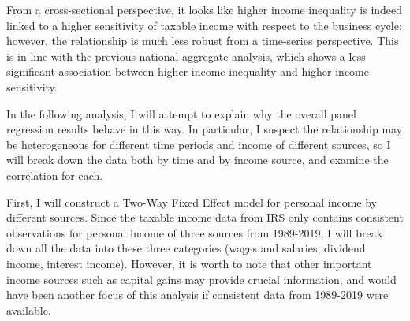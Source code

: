 \documentclass{article}
\begin{document}
From a cross-sectional perspective, it looks like higher income inequality is indeed linked to a higher sensitivity of taxable income with respect to the business cycle; however, the relationship is much less robust from a time-series perspective. This is in line with the previous national aggregate analysis, which shows a less significant association between higher income inequality and higher income sensitivity. 

\vspace{5mm}

In the following analysis, I will attempt to explain why the overall panel regression results behave in this way. In particular, I suspect the relationship may be heterogeneous for different time periods and income of different sources, so I will break down the data both by time and by income source, and examine the correlation for each. 

First, I will construct a Two-Way Fixed Effect model for personal income by different sources. Since the taxable income data from IRS only contains consistent observations for personal income of three sources from 1989-2019, I will break down all the data into these three categories (wages and salaries, dividend income, interest income). However, it is worth to note that other important income sources such as capital gains may provide crucial information, and would have been another focus of this analysis if consistent data from 1989-2019 were available. 
\end{document}

